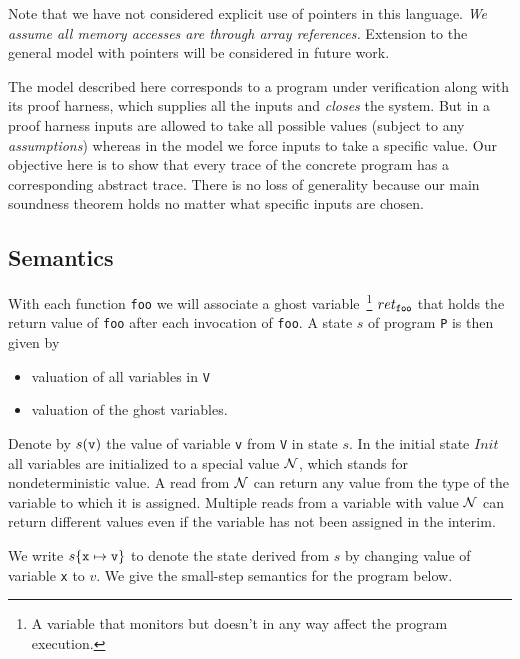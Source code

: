 Note that we have not considered explicit use of pointers in this
language. \emph{We assume all memory accesses are through array
references.} Extension to the general model with pointers will be
considered in future work.

The model described here corresponds to a program under verification
along with its proof harness, which supplies all the inputs and
\emph{closes} the system. But in a proof harness inputs are allowed to
take all possible values (subject to any \emph{assumptions}) whereas
in the model we force inputs to take a specific value. Our objective
here is to show that every trace of the concrete program has a
corresponding abstract trace. There is no loss of generality because
our main soundness theorem holds no matter what specific inputs are
chosen.

\subsection{Semantics}

With each function {\tt foo} we will associate a ghost
variable~\footnote{A variable that monitors but doesn't in any way
  affect the program execution.} \(ret_{\tt foo}\) that holds the
return value of {\tt foo} after each invocation of {\tt foo}. A state
\(s\) of program {\tt P} is then given by
\begin{itemize}

\item valuation of all variables in {\tt V}
\item valuation of the ghost variables.
  
\end{itemize}

Denote by \(s({\tt v})\) the value of variable {\tt v} from {\tt V} in
state \(s\).  In the initial state \(Init\) all variables are
initialized to a special value \(\mathcal{N}\), which stands for
nondeterministic value. A read from \(\mathcal{N}\) can return any value from
the type of the variable to which it is assigned. Multiple reads from
a variable with value \(\mathcal{N}\) can return different values even if the
variable has not been assigned in the interim.

We write \(s\{\tt x \mapsto \tt v\}\) to denote the state derived from \(s\) by changing
value of variable {\tt x} to \(v\). We give the small-step semantics for the program below.

